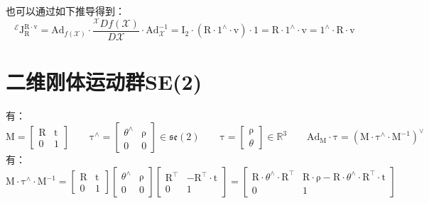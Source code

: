 \documentclass[12pt, onecolumn]{article}
\newcommand\normf{\fangsong}
\newcommand\liehat[1]{#1^{\land}}
\newcommand\lievee[1]{#1^\vee}
\newcommand\bsm[1]{\boldsymbol{\mathrm{#1}}}
\begin{document}
	也可以通过如下推导得到：
	\begin{equation}
	^\mathcal{E}\bsm{J}_{\bsm{R}}^{\bsm{R}\cdot\bsm{v}}=
	\bsm{Ad}_{f(\mathcal{X})}\cdot\frac{{^\mathcal{X}Df(\mathcal{X})}}{D\mathcal{X}}
		\cdot\bsm{Ad}_{\mathcal{X}}^{-1}
		=\bsm{I}_2\cdot\left(\bsm{R}\cdot\liehat{{1}}\cdot\bsm{v} \right) \cdot 1
		=\bsm{R}\cdot\liehat{{1}}\cdot\bsm{v}=\liehat{{1}}\cdot\bsm{R}\cdot\bsm{v}
	\end{equation}
	
	
	\section{\normf 二维刚体运动群SE(2)}
	有：
	\begin{equation}
	\bsm{M}=\begin{bmatrix}
	\bsm{R}&\bsm{t}\\
	\bsm{0}&1
	\end{bmatrix}
	\qquad
	\liehat{\bsm{\tau}}=\begin{bmatrix}
	\liehat{\theta}&\bsm{\rho}\\
	\bsm{0}&0
	\end{bmatrix}\in\mathfrak{se}(2)
	\qquad
	\bsm{\tau}=\begin{bmatrix}
	\bsm{\rho}\\\theta
	\end{bmatrix}\in\mathbb{R}^3
	\qquad
	\bsm{Ad}_{\bsm{M}}\cdot\bsm{\tau}=\lievee{\left(\bsm{M}\cdot\liehat{\bsm{\tau}}\cdot\bsm{M}^{-1} \right) }
	\end{equation}
	有：
	\begin{equation}	
	\bsm{M}\cdot\liehat{\bsm{\tau}}\cdot\bsm{M}^{-1}=
	\begin{bmatrix}
		\bsm{R}&\bsm{t}\\
		\bsm{0}&1
		\end{bmatrix}\begin{bmatrix}
			\liehat{\theta}&\bsm{\rho}\\
			\bsm{0}&0
			\end{bmatrix}	\begin{bmatrix}
					\bsm{R}^\top&-\bsm{R}^\top\cdot\bsm{t}\\
					\bsm{0}&1
					\end{bmatrix}=\begin{bmatrix}
					\bsm{R}\cdot\liehat{\theta}\cdot\bsm{R}^\top&\bsm{R}\cdot\bsm{\rho}-\bsm{R}\cdot\liehat{\theta}\cdot\bsm{R}^\top\cdot\bsm{t}\\
					\bsm{0}&1
					\end{bmatrix}
	\end{equation}
\end{document}
